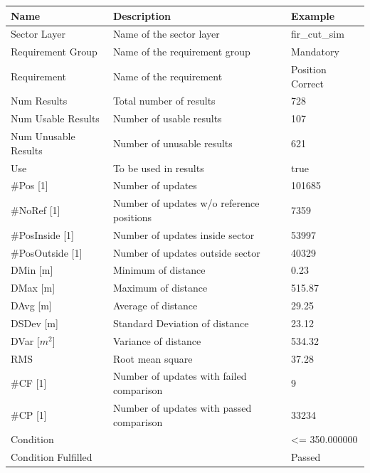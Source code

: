 \begin{center}
 \begin{table}[H]
  \begin{tabularx}{\textwidth}{ | l | X |  l | }
    \hline
    \textbf{Name} & \textbf{Description} & \textbf{Example} \\ \hline
    Sector Layer & Name of the sector layer & fir\_cut\_sim \\ \hline
    Requirement Group & Name of the requirement group & Mandatory \\ \hline
    Requirement & Name of the requirement & Position Correct \\ \hline
    Num Results & Total number of results & 728 \\ \hline
    Num Usable Results & Number of usable results & 107 \\ \hline
    Num Unusable Results & Number of unusable results & 621 \\ \hline
    Use & To be used in results & true \\ \hline
    \#Pos [1] & Number of updates & 101685 \\ \hline
    \#NoRef [1] & Number of updates w/o reference positions & 7359 \\ \hline
    \#PosInside [1] & Number of updates inside sector & 53997 \\ \hline
    \#PosOutside [1] & Number of updates outside sector & 40329 \\ \hline
    DMin [m] & Minimum of distance & 0.23 \\ \hline
    DMax [m] & Maximum of distance & 515.87 \\ \hline
    DAvg [m] & Average of distance & 29.25 \\ \hline
    DSDev [m] & Standard Deviation of distance & 23.12 \\ \hline
    DVar [$m^2$] & Variance of distance & 534.32 \\ \hline
    RMS & Root mean square & 37.28 \\ \hline
    \#CF [1] & Number of updates with failed comparison & 9 \\ \hline
    \#CP [1] & Number of updates with passed comparison  & 33234 \\ \hline
    Condition &  & <= 350.000000 \\ \hline
    Condition Fulfilled &  & Passed \\ \hline
\end{tabularx}
\end{table}
\end{center}

